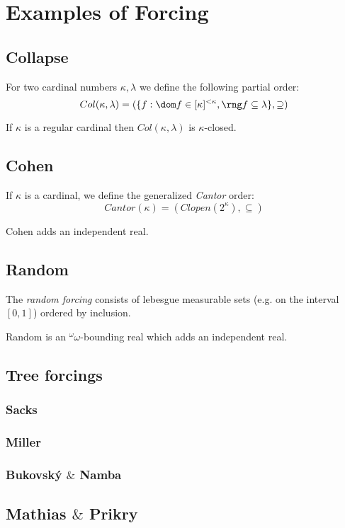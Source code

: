 
\section{Examples of Forcing}
\subsection{Collapse}
\begin{definition}For two cardinal numbers $\kappa,\lambda$ we define the following partial order:
 \begin{displaymath}
  Col(\kappa,\lambda)=(\{f:\dom f\in[\kappa]^{<\kappa}, \rng f\subseteq\lambda\},\supseteq)
 \end{displaymath}
\end{definition}

\begin{prop} If $\kappa$ is a regular cardinal then $Col(\kappa,\lambda)$ is $\kappa$-closed.
\end{prop}

\subsection{Cohen}
\begin{definition} If $\kappa$ is a cardinal, we define the generalized \emph{Cantor} order:
 \begin{displaymath}
  Cantor(\kappa)=(Clopen(2^\kappa),\subseteq)
 \end{displaymath}
\end{definition}

\begin{prop} Cohen adds an independent real.
\end{prop}


\subsection{Random}
\begin{definition} The \emph{random forcing} consists of lebesgue measurable sets (e.g. on the interval $[0,1]$)
 ordered by inclusion.
\end{definition}
\begin{prop} Random is an ${}^\omega\omega$-bounding real which adds an independent real.
\end{prop}

\subsection{Tree forcings}
\subsubsection{Sacks}
\subsubsection{Miller}
\subsubsection{Bukovsk\'y $\&$ Namba}
\subsection{Mathias $\&$ Prikry}
